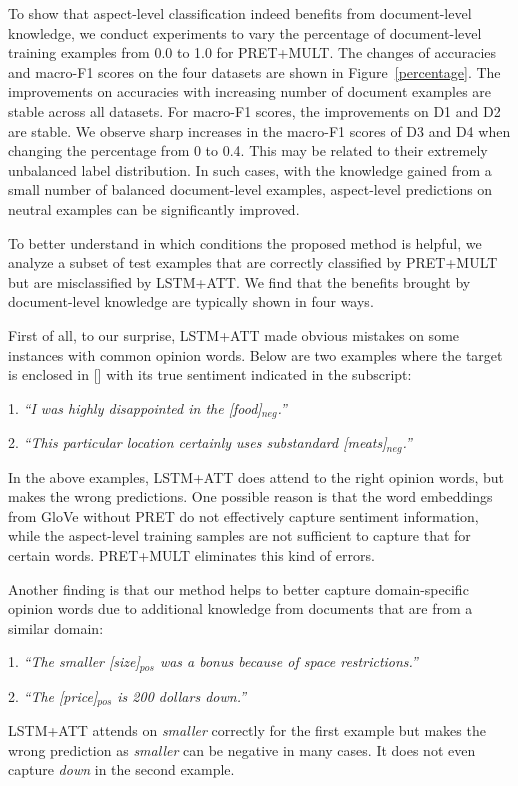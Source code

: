 \documentclass[11pt,a4paper]{article}
\begin{document}
To show that aspect-level classification indeed benefits from document-level knowledge, we conduct experiments to vary the percentage of document-level training examples from 0.0 to 1.0 for PRET+MULT. The changes of accuracies and macro-F1 scores on the four datasets are shown in Figure~\ref{percentage}. The improvements on accuracies with increasing number of document examples are stable across all datasets. For macro-F1 scores, the improvements on D1 and D2 are stable. We observe sharp increases in the macro-F1 scores of D3 and D4 when changing the percentage from 0 to 0.4. This may be related to their extremely unbalanced label distribution. In such cases, with the knowledge gained from a small number of balanced document-level examples, aspect-level predictions on neutral examples can be significantly improved. 

To better understand in which conditions the proposed method is helpful, we analyze a subset of test examples that are correctly classified by PRET+MULT but are misclassified by LSTM+ATT. We find that the benefits brought by document-level knowledge are typically shown in four ways.

First of all, to our surprise, LSTM+ATT made obvious mistakes on some instances with common opinion words. Below are two examples where the target is enclosed in [] with its true sentiment indicated in the subscript:

1. \emph{``I was highly disappointed in the [food]$_{neg}$.''}

2. \emph{``This particular location certainly uses substandard [meats]$_{neg}$.''}

In the above examples, LSTM+ATT does attend to the right opinion words, but makes the wrong predictions. One possible reason is that the word embeddings from GloVe without PRET do not effectively capture sentiment information, while the aspect-level training samples are not sufficient to capture that for certain words. PRET+MULT eliminates this kind of errors.

Another finding is that our method helps to better capture domain-specific opinion words due to additional knowledge from documents that are from a similar domain:

1. \emph{``The smaller [size]$_{pos}$ was a bonus because of space restrictions.''}

2. \emph{``The [price]$_{pos}$ is 200 dollars down.''}

LSTM+ATT attends on \emph{smaller} correctly for the first example but makes the wrong prediction as \emph{smaller} can be negative in many cases. It does not even capture \emph{down} in the second example.
\end{document}
